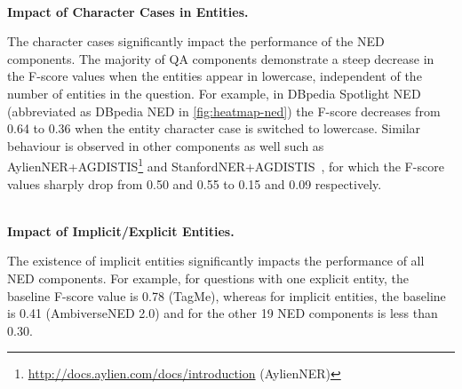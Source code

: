 \documentclass[sigconf,edbt]{acmart-edbt2019}
\begin{document}
~\\
{\bf Impact of Character Cases in Entities.} \begin{inparaenum}
The character cases significantly impact the performance of the NED components. The majority of QA components demonstrate a steep decrease in the F-score values when the entities appear in lowercase, independent of the number of entities in the question. For example, in DBpedia Spotlight NED \cite{MendesJGB11} (abbreviated as DBpedia NED in \autoref{fig:heatmap-ned}) the F-score decreases from 0.64 to 0.36 when the entity character case is switched to lowercase. Similar behaviour is observed in other components as well such as AylienNER+AGDISTIS\footnote{\url{http://docs.aylien.com/docs/introduction} (AylienNER)} \cite{UsbeckNRGCAB14} and StanfordNER+AGDISTIS~\cite{DBLP:conf/acl/FinkelGM05,UsbeckNRGCAB14}, for which the F-score values sharply drop from 0.50 and 0.55 to 0.15 and 0.09 respectively.
\end{inparaenum}
~\\
{\bf Impact of Implicit/Explicit Entities.} \begin{inparaenum}
The existence of implicit entities significantly impacts the performance of all NED components. For example, for questions with one explicit entity, the baseline F-score value is 0.78 (TagMe), whereas for implicit entities, the baseline is 0.41 (AmbiverseNED 2.0) and for the other 19 NED components is less than 0.30.
\end{inparaenum}
\end{document}
